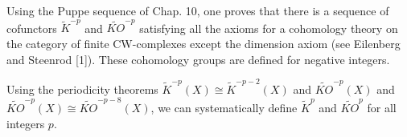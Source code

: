 Using the Puppe sequence of Chap. 10, one proves that there is a sequence of cofunctors $\tilde{K}^{-p}$ and $\tilde{KO}^{-p}$ satisfying all the axioms for a cohomology theory on the category of finite CW-complexes except the dimension axiom (see Eilenberg and Steenrod [1]). These cohomology groups are defined for negative integers.

Using the periodicity theorems $\tilde{K}^{-p}(X) \cong \tilde{K}^{-p-2}(X)$ and $\tilde{KO}^{-p}(X)$ and $\tilde{KO}^{-p}(X) \cong \tilde{KO}^{-p-8}(X)$, we can systematically define $\tilde{K}^p$ and $\tilde{KO}^p$ for all integers $p$.
